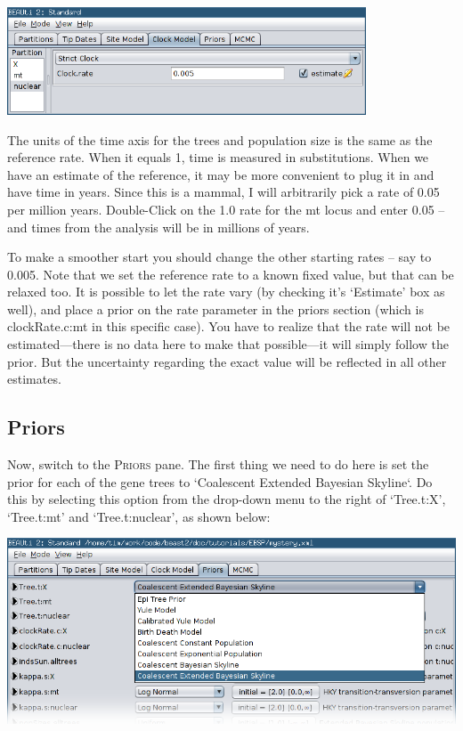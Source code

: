 \documentclass[a4paper,11pt]{article}
\begin{document}
\begin{center}
\includegraphics[width=0.8\textwidth]{figures/clock_model4.png}
\end{center}

The units of the time axis for the trees and population size is the same as the
reference rate. When it equals 1, time is measured in substitutions. When we
have an estimate of the reference, it may be more convenient to plug it in and
have time in years. Since this is a mammal, I will arbitrarily pick a rate of
0.05 per million years. Double-Click on the 1.0 rate for the mt locus and enter
0.05 – and times from the analysis will be in millions of years.

To make a smoother start you should change the other starting rates – say to
0.005.  Note that we set the reference rate to a known fixed value, but that
can be relaxed too. It is possible to let the rate vary (by checking it's
`Estimate' box as well), and place a prior on the rate parameter in the priors
section (which is clockRate.c:mt in this specific case). You have to realize
that the rate will not be estimated---there is no data here to make that
possible---it will simply follow the prior. But the uncertainty regarding the
exact value will be reflected in all other estimates.

\subsection{Priors}

Now, switch to the \textsc{Priors} pane. The first thing we need to do here is
set the prior for each of the gene trees to `Coalescent Extended Bayesian
Skyline`.  Do this by selecting this option from the drop-down menu to the
right of `Tree.t:X', `Tree.t:mt' and `Tree.t:nuclear', as shown below:

\includegraphics[width=\textwidth]{figures/tree_prior.png}
\end{document}
